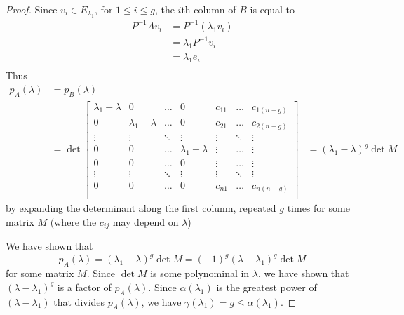 \documentclass{article}
\begin{document}
\begin{proof}
      Since $v_i \in E_{\lambda_1}$, for $1 \leq i \leq g$, the $i$th column of $B$ is equal to
      \begin{align*}
        P^{-1}Av_i &= P^{-1}(\lambda_1v_i)\\
        &= \lambda_1P^{-1}v_i\\
        &= \lambda_1e_i\\
      \end{align*}
      Thus
      \begin{align*}
        p_A(\lambda) &= p_B(\lambda)\\
        &= \det
        \begin{bmatrix}
          \lambda_1 - \lambda & 0 & \dots & 0 & c_{11} & \dots & c_{1(n-g)}\\
          0 & \lambda_1 - \lambda & \dots & 0 & c_{21} & \dots & c_{2(n-g)}\\
          \vdots & \vdots & \ddots& \vdots & \vdots & \ddots & \vdots\\
          0 & 0 & \dots & \lambda_1 - \lambda & \vdots & \dots & \vdots\\
          0 & 0 & \dots & 0 & \vdots & \dots & \vdots\\
          \vdots & \vdots & \ddots& \vdots & \vdots & \ddots & \vdots\\
          0 & 0 & \dots & 0 & c_{n1} & \dots & c_{n(n-g)}\\
        \end{bmatrix}
        &= (\lambda_1 - \lambda)^g \det M
      \end{align*}
      by expanding the determinant along the first column, repeated $g$ times for some matrix $M$ (where the $c_{ij}$ may depend on $\lambda$)

      We have shown that \[
        p_A(\lambda) = (\lambda_1 - \lambda)^g \det M = (-1)^g (\lambda - \lambda_1)^g \det M
      \]
      for some matrix $M$. Since $\det M$ is some polynominal in $\lambda$, we have shown that $(\lambda - \lambda_1)^g$ is a factor of $p_A(\lambda)$. Since $\alpha(\lambda_1)$ is the greatest power of $(\lambda - \lambda_1)$ that divides $p_A(\lambda)$, we have $\gamma(\lambda_1) = g \leq \alpha(\lambda_1)$.
    \end{proof}
\end{document}
